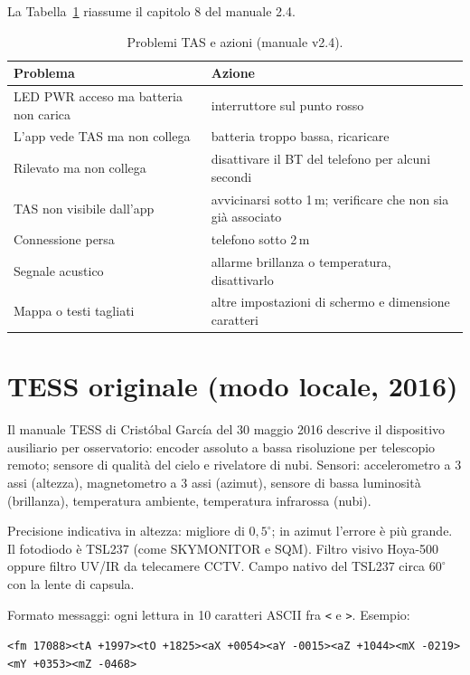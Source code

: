 \documentclass[11pt,a4paper]{report}
\begin{document}
La Tabella~\ref{tab:tasprob} riassume il capitolo 8 del manuale 2.4.

\begin{table}[ht!]
\centering
\caption{Problemi TAS e azioni (manuale v2.4).}
\label{tab:tasprob}

\begin{tabular}{p{}p{}}
\toprule
Problema & Azione \\
\midrule
LED PWR acceso ma batteria non carica & interruttore sul punto rosso \\
L'app vede TAS ma non collega & batteria troppo bassa, ricaricare \\
Rilevato ma non collega & disattivare il BT del telefono per alcuni secondi \\
TAS non visibile dall'app & avvicinarsi sotto 1\,m; verificare che non sia già associato \\
Connessione persa & telefono sotto 2\,m \\
Segnale acustico & allarme brillanza o temperatura, disattivarlo \\
Mappa o testi tagliati & altre impostazioni di schermo e dimensione caratteri \\
\bottomrule
\end{tabular}
\end{table}

\chapter{TESS originale (modo locale, 2016)}

Il manuale TESS di Cristóbal García del 30 maggio 2016 descrive il dispositivo ausiliario per osservatorio: encoder assoluto a bassa risoluzione per telescopio remoto; sensore di qualità del cielo e rivelatore di nubi. Sensori: accelerometro a 3 assi (altezza), magnetometro a 3 assi (azimut), sensore di bassa luminosità (brillanza), temperatura ambiente, temperatura infrarossa (nubi).

Precisione indicativa in altezza: migliore di $0{,}5^\circ$; in azimut l'errore è più grande. Il fotodiodo è TSL237 (come SKYMONITOR e SQM). Filtro visivo Hoya-500 oppure filtro UV/IR da telecamere CCTV. Campo nativo del TSL237 circa $60^\circ$ con la lente di capsula.

Formato messaggi: ogni lettura in 10 caratteri ASCII fra \texttt{<} e \texttt{>}. Esempio:

\texttt{<fm 17088><tA +1997><tO +1825><aX +0054><aY -0015><aZ +1044><mX -0219><mY +0353><mZ -0468>}
\end{document}
